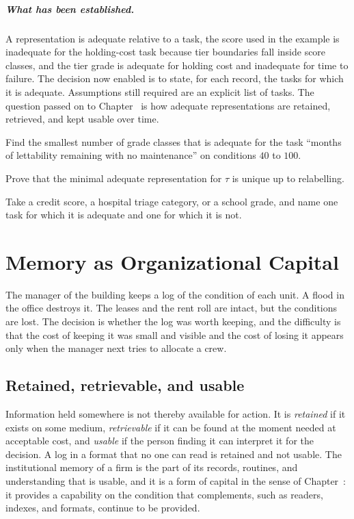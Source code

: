 \paragraph{What has been established.} A representation is adequate relative to a task, the score used in the example is inadequate for the holding-cost task because tier boundaries fall inside score classes, and the tier grade is adequate for holding cost and inadequate for time to failure. The decision now enabled is to state, for each record, the tasks for which it is adequate. Assumptions still required are an explicit list of tasks. The question passed on to Chapter~ is how adequate representations are retained, retrieved, and kept usable over time.

\begin{exercise}
Find the smallest number of grade classes that is adequate for the task ``months of lettability remaining with no maintenance'' on conditions $40$ to $100$.
\end{exercise}
\begin{exercise}
Prove that the minimal adequate representation for $\tau$ is unique up to relabelling.
\end{exercise}
\begin{exercise}
Take a credit score, a hospital triage category, or a school grade, and name one task for which it is adequate and one for which it is not.
\end{exercise}

\chapter{Memory as Organizational Capital}\label{ch:22}

The manager of the building keeps a log of the condition of each unit. A flood in the office destroys it. The leases and the rent roll are intact, but the conditions are lost. The decision is whether the log was worth keeping, and the difficulty is that the cost of keeping it was small and visible and the cost of losing it appears only when the manager next tries to allocate a crew.

\section{Retained, retrievable, and usable}

Information held somewhere is not thereby available for action. It is \emph{retained} if it exists on some medium, \emph{retrievable} if it can be found at the moment needed at acceptable cost, and \emph{usable} if the person finding it can interpret it for the decision. A log in a format that no one can read is retained and not usable. The institutional memory of a firm is the part of its records, routines, and understanding that is usable, and it is a form of capital in the sense of Chapter~: it provides a capability on the condition that complements, such as readers, indexes, and formats, continue to be provided.

